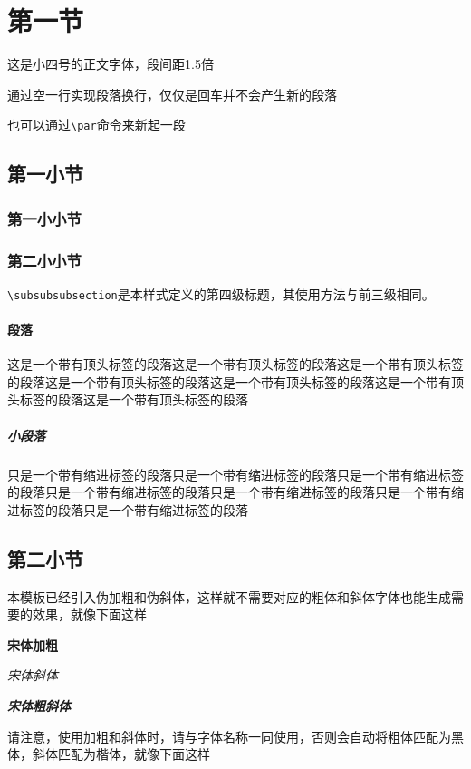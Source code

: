 \documentclass[supercite,gbtcite]{HustGraduPaper}
\begin{document}
	\clearpage%
	
	\section{第一节}
	这是小四号的正文字体，段间距1.5倍
	
	通过空一行实现段落换行，仅仅是回车并不会产生新的段落
	\par 也可以通过\verb|\par|命令来新起一段
	\subsection{第一小节}
	\subsubsection{第一小小节}
	\subsubsection{第二小小节}
	\label{subsubsubsec:subsubsubsec}
	
	\verb|\subsubsubsection|是本样式定义的第四级标题，其使用方法与前三级相同。
	
	\paragraph{段落}\label{para:para}这是一个带有顶头标签的段落这是一个带有顶头标签的段落这是一个带有顶头标签的段落这是一个带有顶头标签的段落这是一个带有顶头标签的段落这是一个带有顶头标签的段落这是一个带有顶头标签的段落
	\subparagraph{小段落}\label{subpara:subpara}只是一个带有缩进标签的段落只是一个带有缩进标签的段落只是一个带有缩进标签的段落只是一个带有缩进标签的段落只是一个带有缩进标签的段落只是一个带有缩进标签的段落只是一个带有缩进标签的段落
	\subsection{第二小节}
	本模板已经引入伪加粗和伪斜体，这样就不需要对应的粗体和斜体字体也能生成需要的效果，就像下面这样
	
	{\songti \bfseries 宋体加粗}
	
	{\songti \itshape 宋体斜体}
	
	{\songti \bfseries \itshape 宋体粗斜体}
	
	请注意，使用加粗和斜体时，请与字体名称一同使用，否则会自动将粗体匹配为黑体，斜体匹配为楷体，就像下面这样
	
\end{document}
